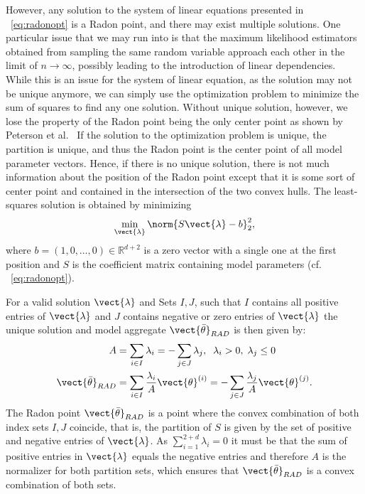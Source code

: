 However, any solution to the system of linear equations presented in \eq~\ref{eq:radonopt} is a Radon point, and there may exist multiple solutions.
One particular issue that we may run into is that the maximum likelihood estimators obtained from sampling the same random variable approach each other in the limit of $n \rightarrow \infty$, possibly leading to the introduction of linear dependencies.
While this is an issue for the system of linear equation, as the solution may not be unique anymore, we can simply use the optimization problem to minimize the sum of squares to find any one solution.
Without unique solution, however, we lose the property of the Radon point being the only center point as shown by Peterson et al.~\cite{peterson1972geometry}
If the solution to the optimization problem is unique, the partition is unique, and thus the Radon point is the center point of all model parameter vectors.
Hence, if there is no unique solution, there is not much information about the position of the Radon point except that it is some sort of center point and contained in the intersection of the two convex hulls.
The least-squares solution is obtained by minimizing
\begin{equation}
    \label{eq:lstsq}
        \min_{\vect{\lambda}} \norm{S\vect{\lambda} - b}^2_2,
\end{equation}
where $b=(1, 0, \ldots, 0) \in \mathbb{R}^{d+2}$ is a zero vector with a single one at the first position and $S$ is the coefficient matrix containing model parameters (cf. \eq~\ref{eq:radonopt}).

For a valid solution $\vect{\lambda}$ and Sets $I,J$, such that $I$ contains all positive entries of $\vect{\lambda}$ and $J$ contains negative or zero entries of $\vect{\lambda}$ the unique solution and model aggregate $\vect{\bar{\theta}}_{RAD}$ is then given by:
\begin{equation}
    \label{eq:radonpoint}
    \begin{split}
    A &= \sum_{i\in I} \lambda_i = - \sum_{j\in J} \lambda_j, \; \;\lambda_i > 0, \; \lambda_j \leq 0 \\
    \vect{\bar{\theta}}_{RAD} &= \sum_{i\in I} \frac{\lambda_i}{A} \vect{\theta}^{(i)} = - \sum_{j\in J} \frac{\lambda_j}{A} \vect{\theta}^{(j)}.
    \end{split}
\end{equation}
The Radon point $\vect{\bar{\theta}}_{RAD}$ is a point where the convex combination of both index sets $I, J$ coincide, that is, the partition of $S$ is given by the set of positive and negative entries of $\vect{\lambda}$.
As $\sum_{i=1}^{2+d} \lambda_i = 0$ it must be that the sum of positive entries in $\vect{\lambda}$ equals the negative entries and therefore $A$ is the normalizer for both partition sets, which ensures that $\vect{\bar{\theta}}_{RAD}$ is a convex combination of both sets.

